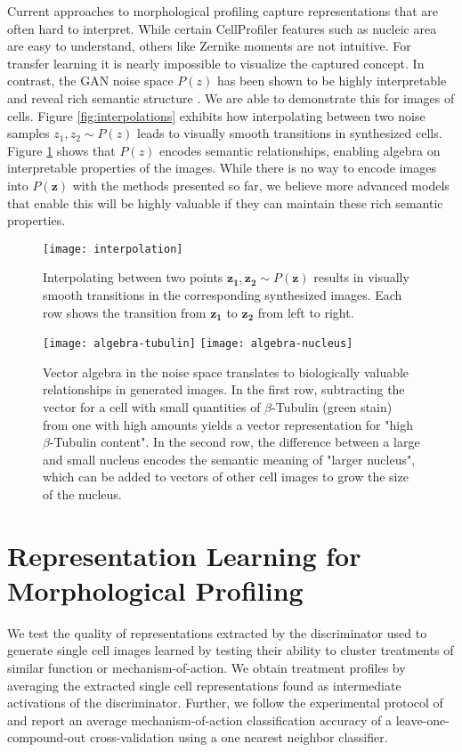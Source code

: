\documentclass{article}
\begin{document}
Current approaches to morphological profiling capture representations that are
often hard to interpret. While certain CellProfiler features such as nucleic
area are easy to understand, others like Zernike moments are not intuitive. For
transfer learning it is nearly impossible to visualize the captured concept. In
contrast, the GAN noise space $P(z)$ has been shown to be highly interpretable
and reveal rich semantic structure \cite{radford2015unsupervised}. We are able
to demonstrate this for images of cells. Figure \ref{fig:interpolations}
exhibits how interpolating between two noise samples $z_1, z_2 \sim P(z)$ leads
to visually smooth transitions in synthesized cells. Figure \ref{fig:algebra}
shows that $P(z)$ encodes semantic relationships, enabling algebra on
interpretable properties of the images. While there is no way to encode images
into $P(\mathbf{z})$ with the methods presented so far, we believe more advanced
models that enable this will be highly valuable if they can maintain these rich
semantic properties.

\begin{figure}
  \centering
  \texttt{[image: interpolation]}
  \caption{Interpolating between two points $\mathbf{z_1}, \mathbf{z_2} \sim P(\mathbf{z})$ results in visually smooth transitions in the corresponding synthesized images. Each row shows the transition from $\mathbf{z_1}$ to $\mathbf{z_2}$ from left to right.}
  \vspace{-0.1cm}
\end{figure}

\begin{figure}
  \centering
  \texttt{[image: algebra-tubulin]}
  \texttt{[image: algebra-nucleus]}
  \caption{Vector algebra in the noise space translates to biologically valuable relationships in generated images. In the first row, subtracting the vector for a cell with small quantities of $\beta$-Tubulin (green stain) from one with high amounts yields a vector representation for "high $\beta$-Tubulin content". In the second row, the difference between a large and small nucleus encodes the semantic meaning of "larger nucleus", which can be added to vectors of other cell images to grow the size of the nucleus.}
  \label{fig:algebra}
\end{figure}

\section{Representation Learning for Morphological Profiling}\label{moa}
We test the quality of representations extracted by the discriminator used to generate single cell images learned by testing their ability to cluster treatments of similar function or mechanism-of-action. We obtain treatment profiles by averaging the extracted single cell representations found as intermediate activations of the discriminator. Further, we follow the experimental protocol of \cite{Ljosa2013} and report an average mechanism-of-action classification accuracy of a leave-one-compound-out cross-validation using a one nearest neighbor classifier.
\end{document}
